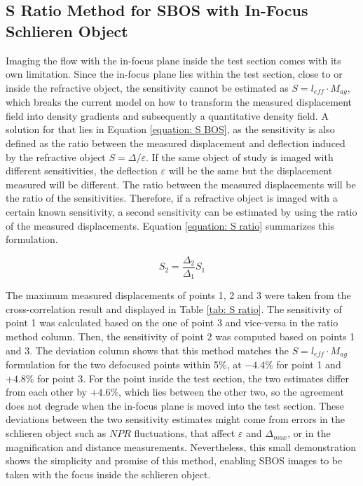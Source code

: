 \subsection{S Ratio Method for SBOS with In-Focus Schlieren Object}
\label{subsection: Aerospike S Ratio}

Imaging the flow with the in-focus plane inside the test section comes with its own limitation. Since the in-focus plane lies within the test section, close to or inside the refractive object, the sensitivity cannot be estimated as $S = l_{eff} \cdot M_{ag}$, which breaks the current model on how to transform the measured displacement field into density gradients and subsequently a quantitative density field. A solution for that lies in Equation \ref{equation: S BOS}, as the sensitivity is also defined as the ratio between the measured displacement and deflection induced by the refractive object $S = \Delta/\varepsilon$. If the same object of study is imaged with different sensitivities, the deflection $\varepsilon$ will be the same but the displacement measured will be different. The ratio between the measured displacements will be the ratio of the sensitivities. Therefore, if a refractive object is imaged with a certain known sensitivity, a second sensitivity can be estimated by using the ratio of the measured displacements. Equation \ref{equation: S ratio} summarizes this formulation.

\begin{equation}
    \label{equation: S ratio}
    S_2 = \frac{\Delta_2}{\Delta_1} S_1
\end{equation}

The maximum measured displacements of points 1, 2 and 3 were taken from the cross-correlation result and displayed in Table \ref{tab: S ratio}. The sensitivity of point 1 was calculated based on the one of point 3 and vice-versa in the ratio method column. Then, the sensitivity of point 2 was computed based on points 1 and 3. The deviation column shows that this method matches the $S = l_{eff} \cdot M_{ag}$ formulation for the two defocused points within 5\%, at $-4.4\%$ for point 1 and $+4.8\%$ for point 3. For the point inside the test section, the two estimates differ from each other by $+4.6\%$, which lies between the other two, so the agreement does not degrade when the in-focus plane is moved into the test section. These deviations between the two sensitivity estimates might come from errors in the schlieren object such as $NPR$ fluctuations, that affect $\varepsilon$ and $\Delta_{max}$, or in the magnification and distance measurements. Nevertheless, this small demonstration shows the simplicity and promise of this method, enabling SBOS images to be taken with the focus inside the schlieren object.

